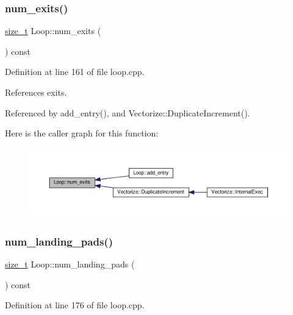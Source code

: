 \subsubsection{\texorpdfstring{num\+\_\+exits()}{num\_exits()}}
{\footnotesize\ttfamily \hyperlink{tutorial__fpt__2017_2intro_2sixth_2test_8c_a7c94ea6f8948649f8d181ae55911eeaf}{size\+\_\+t} Loop\+::num\+\_\+exits (\begin{DoxyParamCaption}{ }\end{DoxyParamCaption}) const}



Definition at line 161 of file loop.\+cpp.



References exits.



Referenced by add\+\_\+entry(), and Vectorize\+::\+Duplicate\+Increment().

Here is the caller graph for this function\+:
\nopagebreak
\begin{figure}[H]
\begin{center}
\leavevmode
\includegraphics[width=350pt]{de/d77/classLoop_afbbd557703452bcebd167cf707759d51_icgraph}
\end{center}
\end{figure}
\mbox{\label{classLoop_a9c0d7e7c5da776ce054653d85a9d8912}} 
\subsubsection{\texorpdfstring{num\+\_\+landing\+\_\+pads()}{num\_landing\_pads()}}
{\footnotesize\ttfamily \hyperlink{tutorial__fpt__2017_2intro_2sixth_2test_8c_a7c94ea6f8948649f8d181ae55911eeaf}{size\+\_\+t} Loop\+::num\+\_\+landing\+\_\+pads (\begin{DoxyParamCaption}{ }\end{DoxyParamCaption}) const}



Definition at line 176 of file loop.\+cpp.



